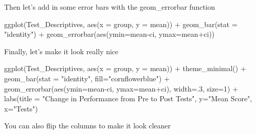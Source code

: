\documentclass[
]{book}
\newenvironment{Shaded}{\begin{snugshade}}{\end{snugshade}}
\newcommand{\AttributeTok}[1]{\textcolor[rgb]{0.77,0.63,0.00}{#1}}
\newcommand{\DecValTok}[1]{\textcolor[rgb]{0.00,0.00,0.81}{#1}}
\newcommand{\FunctionTok}[1]{\textcolor[rgb]{0.00,0.00,0.00}{#1}}
\newcommand{\NormalTok}[1]{#1}
\newcommand{\SpecialCharTok}[1]{\textcolor[rgb]{0.00,0.00,0.00}{#1}}
\newcommand{\StringTok}[1]{\textcolor[rgb]{0.31,0.60,0.02}{#1}}
\begin{document}
Then let's add in some error bars with the geom\_errorbar function

\begin{Shaded}
\begin{Highlighting}[]
\FunctionTok{ggplot}\NormalTok{(Test\_Descriptives, }
       \FunctionTok{aes}\NormalTok{(}\AttributeTok{x =}\NormalTok{ group, }
           \AttributeTok{y =}\NormalTok{ mean)) }\SpecialCharTok{+}
  \FunctionTok{geom\_bar}\NormalTok{(}\AttributeTok{stat =} \StringTok{"identity"}\NormalTok{) }\SpecialCharTok{+}
  \FunctionTok{geom\_errorbar}\NormalTok{(}\FunctionTok{aes}\NormalTok{(}\AttributeTok{ymin=}\NormalTok{mean}\SpecialCharTok{{-}}\NormalTok{ci,}
                    \AttributeTok{ymax=}\NormalTok{mean}\SpecialCharTok{+}\NormalTok{ci))}
\end{Highlighting}
\end{Shaded}

Finally, let's make it look really nice

\begin{Shaded}
\begin{Highlighting}[]
\FunctionTok{ggplot}\NormalTok{(Test\_Descriptives, }
       \FunctionTok{aes}\NormalTok{(}\AttributeTok{x =}\NormalTok{ group,}
           \AttributeTok{y =}\NormalTok{ mean)) }\SpecialCharTok{+}
  \FunctionTok{theme\_minimal}\NormalTok{() }\SpecialCharTok{+}
  \FunctionTok{geom\_bar}\NormalTok{(}\AttributeTok{stat =} \StringTok{"identity"}\NormalTok{, }\AttributeTok{fill=}\StringTok{"cornflowerblue"}\NormalTok{) }\SpecialCharTok{+}
  \FunctionTok{geom\_errorbar}\NormalTok{(}\FunctionTok{aes}\NormalTok{(}\AttributeTok{ymin=}\NormalTok{mean}\SpecialCharTok{{-}}\NormalTok{ci,}
                    \AttributeTok{ymax=}\NormalTok{mean}\SpecialCharTok{+}\NormalTok{ci), }\AttributeTok{width=}\NormalTok{.}\DecValTok{3}\NormalTok{, }\AttributeTok{size=}\DecValTok{1}\NormalTok{) }\SpecialCharTok{+}
  \FunctionTok{labs}\NormalTok{(}\AttributeTok{title =} \StringTok{"Change in Performance from Pre to Post Tests"}\NormalTok{, }
       \AttributeTok{y=}\StringTok{"Mean Score"}\NormalTok{, }\AttributeTok{x=}\StringTok{"Tests"}\NormalTok{)}
\end{Highlighting}
\end{Shaded}

You can also flip the columns to make it look cleaner
\end{document}

